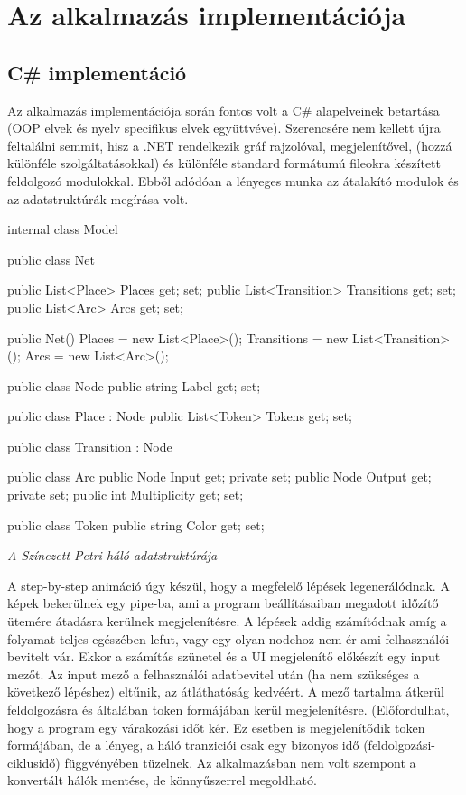 \chapter{Az alkalmazás implementációja}
\section{C\# implementáció}
Az alkalmazás implementációja során fontos volt a C\# alapelveinek betartása (OOP elvek és nyelv specifikus elvek együttvéve). Szerencsére nem kellett újra feltalálni semmit, hisz a .NET rendelkezik gráf rajzolóval, megjelenítővel, (hozzá különféle szolgáltatásokkal) és különféle standard formátumú fileokra készített feldolgozó modulokkal. Ebből adódóan a lényeges munka az átalakító modulok és az adatstruktúrák megírása volt. 
\begin{cpp}
internal class Model
    {
        public class Net
        {
            public List<Place> Places { get; set; }
            public List<Transition> Transitions { get; set; }
            public List<Arc> Arcs { get; set; }

            public Net()
            {
                Places = new List<Place>();
                Transitions = new List<Transition>();
                Arcs = new List<Arc>();
            }
        }

        public class Node
        {
            public string Label { get; set; }
        }

        public class Place : Node
        {
            public List<Token> Tokens { get; set; }
        }

        public class Transition : Node
        {

        }
        public class Arc
        {
            public Node Input { get; private set; }
            public Node Output { get; private set; }
            public int Multiplicity { get; set; }
        }

        public class Token
        {
            public string Color { get; set; }
        }
    }
\end{cpp}
\textsl{A Színezett Petri-háló adatstruktúrája}

A step-by-step animáció úgy készül, hogy a megfelelő lépések legenerálódnak. A képek bekerülnek egy pipe-ba, ami a program beállításaiban megadott időzítő ütemére átadásra kerülnek megjelenítésre. 
A lépések addig számítódnak amíg a folyamat teljes egészében lefut, vagy egy olyan nodehoz nem ér ami felhasználói bevitelt vár. Ekkor a számítás szünetel és a UI megjelenítő előkészít egy input mezőt. Az input mező a felhasználói adatbevitel után (ha nem szükséges a következő lépéshez) eltűnik, az átláthatóság kedvéért. A mező tartalma átkerül feldolgozásra és általában token formájában kerül megjelenítésre. (Előfordulhat, hogy a program egy várakozási időt kér. Ez esetben is megjelenítődik token formájában, de a lényeg, a háló tranziciói csak egy bizonyos idő (feldolgozási-ciklusidő) függvényében tüzelnek. Az alkalmazásban nem volt szempont a konvertált hálók mentése, de könnyűszerrel megoldható.

